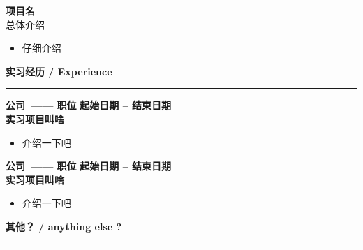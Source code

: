 \documentclass[letterpaper,10pt]{ctexart} %
\newcommand{\sectiontitle}[1]{
    \vspace{0em}
    \noindent\textbf{\large #1} %
    \vspace{0.3em}
    \hrule
    \vspace{0.5em}
}
\begin{document}
\noindent\normalsize %
\textbf{项目名} 
\noindent\small
\\
\quad 总体介绍
\begin{itemize}[noitemsep,topsep=0pt]
    \item 仔细介绍
\end{itemize}

\vspace{0.5em}

\sectiontitle{实习经历 / Experience}

\noindent\normalsize %
\textbf{公司\ —— 职位}  \hfill \textbf{起始日期 -- 结束日期}
\\
\textbf{实习项目叫啥}\\
\noindent\small
\vspace{-1.5em}
\begin{itemize}[noitemsep,topsep=0pt]
    \item 介绍一下吧
\end{itemize}

\vspace{0.5em}

\noindent\normalsize %
\textbf{公司\ —— 职位}  \hfill \textbf{起始日期 -- 结束日期}
\\
\textbf{实习项目叫啥}\\
\noindent\small
\vspace{-1.5em}
\begin{itemize}[noitemsep,topsep=0pt]
    \item 介绍一下吧
\end{itemize}

\vspace{0.5em}

\sectiontitle{其他？ / anything else ?}
\end{document}

